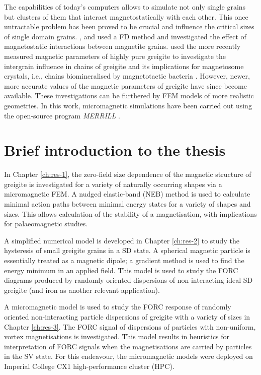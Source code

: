 The capabilities of today's computers allows to simulate not only single grains but clusters of them that interact magnetostatically with each other. This once untractable problem has been proved to be crucial and influence the critical sizes of single domain grains. \citet{Muxworthy2003}, \citet{Muxworthy2004} and \citet{Muxworthy2006} used a FD method and investigated the effect of magnetostatic interactions between magnetite grains. \citet{Muxworthy2013} used the more recently measured \citep{Chang2008} magnetic parameters of highly pure greigite to investigate the intergrain influence in chains of greigite and its implications for magnetosome crystals, i.e., chains biomineralised by magnetotactic bacteria \citep{Lefevre2011}. However, newer, more accurate values of the magnetic parameters of greigite \citep{Li2014} have since become available. These investigations can be furthered by FEM models of more realistic geometries. In this work, micromagnetic simulations have been carried out using the open-source program \emph{MERRILL} \citep{OConbhui2017}.\par

\section{Brief introduction to the thesis}
In Chapter \ref{ch:res-1}, the zero-field size dependence of the magnetic structure of greigite is investigated for a variety of naturally occurring shapes via a micromagnetic FEM. A nudged elastic-band (NEB) method \citep{Fabian2017} is used to calculate minimal action paths between minimal energy states for a variety of shapes and sizes. This allows calculation of the stability of a magnetisation, with implications for palaeomagnetic studies.\par

A simplified numerical model is developed in Chapter \ref{ch:res-2} to study the hysteresis of small greigite grains in a SD state. A spherical magnetic particle is essentially treated as a magnetic dipole; a gradient method is used to find the energy minimum in an applied field. This model is used to study the FORC diagrams produced by randomly oriented dispersions of non-interacting ideal SD greigite (and iron as another relevant application).\par

A micromagnetic model is used to study the FORC response of randomly oriented non-interacting particle dispersions of greigite with a variety of sizes in Chapter \ref{ch:res-3}. The FORC signal of dispersions of particles with non-uniform, vortex magnetisations is investigated. This model results in heuristics for interpretation of FORC signals when the magnetisations are carried by particles in the SV state. For this endeavour, the micromagnetic models were deployed on Imperial College CX1 high-performance cluster (HPC).\par


